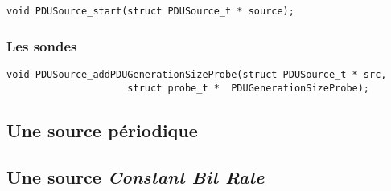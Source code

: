 \begin{verbatim}
void PDUSource_start(struct PDUSource_t * source);
\end{verbatim}

%
\subsubsection{Les sondes}

\begin{verbatim}
void PDUSource_addPDUGenerationSizeProbe(struct PDUSource_t * src,
					 struct probe_t *  PDUGenerationSizeProbe);
\end{verbatim}

%
\subsection{Une source périodique}

%
\subsection{Une source {\em Constant Bit Rate}}
